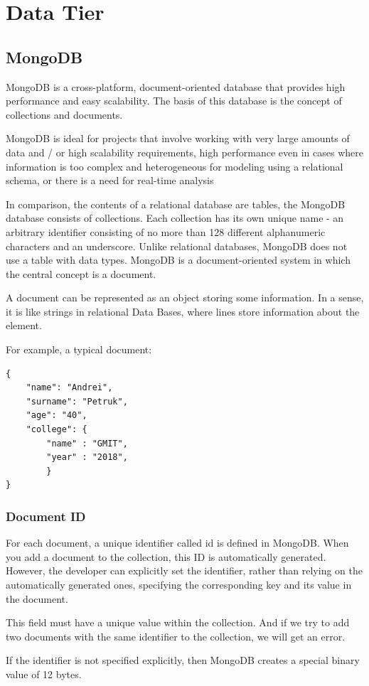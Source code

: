 \section{Data Tier}

\subsection{MongoDB}
MongoDB is a cross-platform, document-oriented database that provides high performance and easy scalability. The basis of this database is the concept of collections and documents.\par
MongoDB is ideal for projects that involve working with very large amounts of data and / or high scalability requirements, high performance even in cases where information is too complex and heterogeneous for modeling using a relational schema, or there is a need for real-time analysis \par
In comparison, the contents of a relational database are tables, the MongoDB database consists of collections. Each collection has its own unique name - an arbitrary identifier consisting of no more than 128 different alphanumeric characters and an underscore.
Unlike relational databases, MongoDB does not use a table with data types. MongoDB is a document-oriented system in which the central concept is a document. \par
A document can be represented as an object storing some information. In a sense, it is like strings in relational Data Bases, where lines store information about the element. \cite{MongoDB} \par For example, a typical document:

\begin{verbatim}
{
    "name": "Andrei",
    "surname": "Petruk",
    "age": "40",
    "college": {
        "name" : "GMIT",
        "year" : "2018",
        }
}
\end{verbatim}

\subsubsection{Document ID}
For each document, a unique identifier called id is defined in MongoDB. When you add a document to the collection, this ID is automatically generated. However, the developer can explicitly set the identifier, rather than relying on the automatically generated ones, specifying the corresponding key and its value in the document.\par
This field must have a unique value within the collection. And if we try to add two documents with the same identifier to the collection, we will get an error.\par
If the identifier is not specified explicitly, then MongoDB creates a special binary value of 12 bytes.\cite{MongoDBID}

